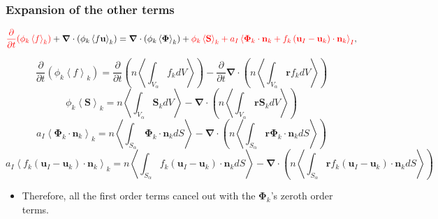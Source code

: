 \documentclass{sintefbeamer}
\newcommand{\kavg}[1]{\left<#1\right>_k}
\newcommand{\Iavg}[1]{\left<#1\right>_I}
\newcommand{\pavg}[1]{n \left<#1\right>}
\newcommand{\nablab}{\bm{\nabla}}
\newcommand{\pddt}{\frac{\partial}{\partial t}}
\begin{document}
\begin{frame}
  \frametitle{Expansion of the other terms}
  \begin{equation*}
    \textcolor{red}{\pddt (\phi_k\kavg{f})}
    +\nablab \cdot \left(
        \phi_k \kavg{f \textbf{u}}
    \right)
    = \nablab \cdot \left(
        \phi_k \kavg{\bm{\Phi}}
    \right)
    + \textcolor{red}{\phi_k \kavg{\textbf{S}}
    + a_I \Iavg{
        \bm{\Phi}_k \cdot \textbf{n}_k
        + f_k 
        \left(
            \textbf{u}_I
            - \textbf{u}_k
        \right) \cdot \textbf{n}_k
    }},
\end{equation*}
  
\begin{equation*}
  \pddt (\phi_k\kavg{f})
  = \pddt \left(\pavg{\int_{V_\alpha} f_k dV}\right)
  - \pddt\nablab \cdot \left(\pavg{\int_{V_\alpha} \textbf{r} f_k dV}\right)
\end{equation*}
\begin{equation*}
  \phi_k\kavg{\textbf{S}}
  =  \pavg{\int_{V_\alpha} \textbf{S}_k dV}
  - \nablab \cdot \left(\pavg{\int_{V_\alpha} \textbf{r} \textbf{S}_k dV}\right)
\end{equation*}
\begin{equation*}
  a_I\kavg{\bm{\Phi}_k \cdot \textbf{n}_k}
  =  \pavg{\int_{S_\alpha} \bm{\Phi}_k \cdot \textbf{n}_k dS}
  - \nablab \cdot \left(\pavg{\int_{S_\alpha} \textbf{r} \bm{\Phi}_k \cdot \textbf{n}_k dS}\right)
\end{equation*}
\begin{equation*}
  a_I\kavg{f_k (\textbf{u}_I - \textbf{u}_k) \cdot \textbf{n}_k}
  =  \pavg{\int_{S_\alpha} f_k (\textbf{u}_I - \textbf{u}_k) \cdot \textbf{n}_k dS}
  - \nablab \cdot \left(\pavg{\int_{S_\alpha} \textbf{r} f_k (\textbf{u}_I - \textbf{u}_k) \cdot \textbf{n}_k dS}\right)
\end{equation*}
\begin{itemize}
  \item Therefore, all the first order terms cancel out with the $\mathbf{\Phi}_k$'s zeroth order terms.
\end{itemize}
\end{frame}
\end{document}
